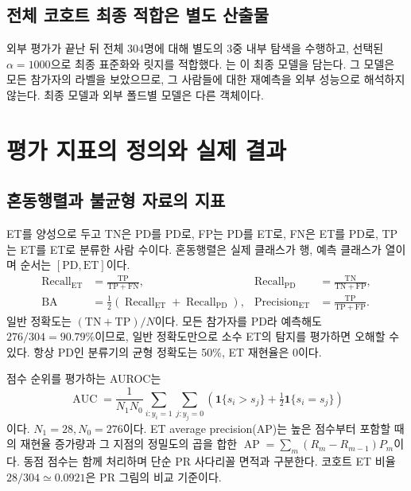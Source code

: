 \documentclass[11pt,a4paper]{article}
\newcommand{\ind}{\mathbf 1}
\newcommand{\code}[1]{\texttt{\detokenize{#1}}}
\DeclareMathOperator{\BA}{BA}
\numberwithin{equation}{section}
\begin{document}
\subsection{전체 코호트 최종 적합은 별도 산출물}
외부 평가가 끝난 뒤 전체 304명에 대해 별도의 3중 내부 탐색을 수행하고,
선택된 $\alpha=1000$으로 최종 표준화와 릿지를 적합했다.
\code{final_model.joblib}는 이 최종 모델을 담는다.
그 모델은 모든 참가자의 라벨을 보았으므로, 그 사람들에 대한 재예측을
외부 성능으로 해석하지 않는다. 최종 모델과 외부 폴드별 모델은 다른 객체이다.

\section{평가 지표의 정의와 실제 결과}
\subsection{혼동행렬과 불균형 자료의 지표}
ET를 양성으로 두고 TN은 PD를 PD로, FP는 PD를 ET로,
FN은 ET를 PD로, TP는 ET를 ET로 분류한 사람 수이다.
혼동행렬은 실제 클래스가 행, 예측 클래스가 열이며 순서는 $[\mathrm{PD},\mathrm{ET}]$이다.
\begin{align}
 \operatorname{Recall}_{\mathrm{ET}}&=\frac{\mathrm{TP}}{\mathrm{TP}+\mathrm{FN}},&
 \operatorname{Recall}_{\mathrm{PD}}&=\frac{\mathrm{TN}}{\mathrm{TN}+\mathrm{FP}},\\
 \BA&=\frac12\left(\operatorname{Recall}_{\mathrm{ET}}+
                         \operatorname{Recall}_{\mathrm{PD}}\right),&
 \operatorname{Precision}_{\mathrm{ET}}&=\frac{\mathrm{TP}}{\mathrm{TP}+\mathrm{FP}}.
\end{align}
일반 정확도는 $(\mathrm{TN}+\mathrm{TP})/N$이다.
모든 참가자를 PD라 예측해도 $276/304=90.79\%$이므로,
일반 정확도만으로 소수 ET의 탐지를 평가하면 오해할 수 있다.
항상 PD인 분류기의 균형 정확도는 50\%, ET 재현율은 0이다.

점수 순위를 평가하는 AUROC는
\begin{equation}
 \operatorname{AUC}=\frac1{N_1N_0}
 \sum_{i:y_i=1}\sum_{j:y_j=0}
 \left(\ind\{s_i>s_j\}+\tfrac12\ind\{s_i=s_j\}\right)
\end{equation}
이다. $N_1=28,N_0=276$이다.
ET average precision(AP)는 높은 점수부터 포함할 때의 재현율 증가량과
그 지점의 정밀도의 곱을 합한
$\operatorname{AP}=\sum_m(R_m-R_{m-1})P_m$이다.
동점 점수는 함께 처리하며 단순 PR 사다리꼴 면적과 구분한다.
코호트 ET 비율 $28/304\simeq0.0921$은 PR 그림의 비교 기준이다.
\end{document}
